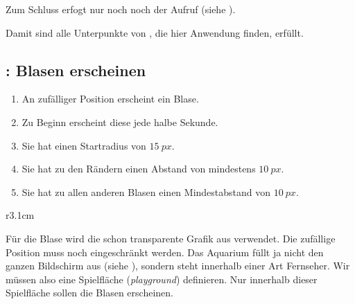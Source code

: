 Zum Schluss erfogt nur noch noch der Aufruf (siehe ).



Damit sind alle Unterpunkte von , die hier Anwendung finden, erfüllt.

\subsection{: Blasen erscheinen}
\begin{enumerate}
    \item An zufälliger Position erscheint ein Blase.\label{reqBlasenErscheinenZufall}
    \item Zu Beginn erscheint diese jede halbe Sekunde.\label{reqBlasenErscheinenIntervall}
    \item Sie hat einen Startradius von $15~px$.\label{reqBlasenErscheinenRadius}
    \item Sie hat zu den Rändern einen Abstand von mindestens $10~px$.\label{reqBlasenErscheinenAbstand}
    \item Sie hat zu allen anderen Blasen einen Mindestabstand von $10~px$.\label{reqBlasenErscheinenMindestabstand}
\end{enumerate}
\er

\begin{wrapfigure}[7]{r}{3.1cm}%
	\begin{center}%
		\vspace{-1cm}%
	\end{center}%
\end{wrapfigure}%
Für die Blase wird die schon transparente Grafik aus  verwendet. Die zufällige Position muss noch eingeschränkt werden. Das Aquarium füllt ja nicht den ganzen Bildschirm aus (siehe ), sondern steht innerhalb einer Art Fernseher. Wir müssen also eine Spielfläche (\emph{playground}) definieren. Nur innerhalb dieser Spielfläche sollen die Blasen erscheinen.

